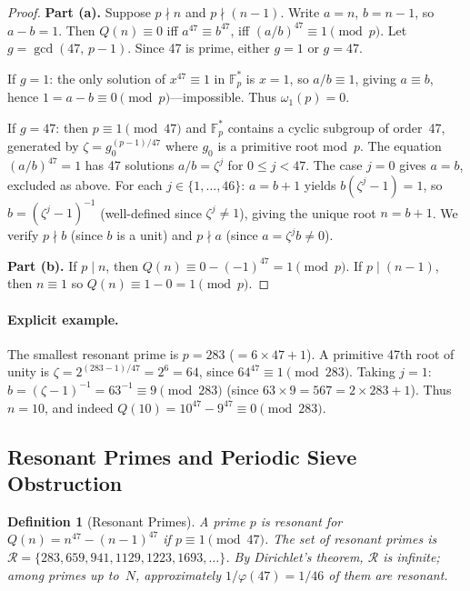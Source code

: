 \documentclass[11pt,a4paper]{article}
\newtheorem{definition}[theorem]{Definition}
\begin{document}
\begin{proof}
\textbf{Part (a).}  Suppose $p \nmid n$ and $p \nmid (n{-}1)$.  Write
$a = n$, $b = n{-}1$, so $a - b = 1$.  Then $Q(n) \equiv 0$
iff $a^{47} \equiv b^{47}$, iff $(a/b)^{47} \equiv 1 \pmod{p}$.
Let $g = \gcd(47,\, p{-}1)$.  Since 47 is prime, either $g = 1$
or $g = 47$.

If $g = 1$: the only solution of $x^{47} \equiv 1$ in
$\mathbb{F}_p^*$ is $x = 1$, so $a/b \equiv 1$, giving
$a \equiv b$, hence $1 = a - b \equiv 0 \pmod{p}$---impossible.
Thus $\omega_1(p) = 0$.

If $g = 47$: then $p \equiv 1 \pmod{47}$ and $\mathbb{F}_p^*$
contains a cyclic subgroup of order~47, generated by
$\zeta = g_0^{(p-1)/47}$ where $g_0$ is a primitive root mod~$p$.
The equation $(a/b)^{47} = 1$ has 47 solutions $a/b = \zeta^j$
for $0 \leq j < 47$.  The case $j = 0$ gives $a = b$, excluded as
above.  For each $j \in \{1, \ldots, 46\}$:
$a = b + 1$ yields $b(\zeta^j - 1) = 1$, so
$b = (\zeta^j - 1)^{-1}$ (well-defined since $\zeta^j \neq 1$),
giving the unique root $n = b + 1$.
We verify $p \nmid b$ (since $b$ is a unit) and $p \nmid a$
(since $a = \zeta^j b \neq 0$).

\textbf{Part (b).}  If $p \mid n$, then
$Q(n) \equiv 0 - (-1)^{47} = 1 \pmod{p}$.
If $p \mid (n{-}1)$, then $n \equiv 1$ so
$Q(n) \equiv 1 - 0 = 1 \pmod{p}$.
\end{proof}

\paragraph{Explicit example.}
The smallest resonant prime is $p = 283$ ($= 6 \times 47 + 1$).
A primitive 47th root of unity is $\zeta = 2^{(283-1)/47}
= 2^6 = 64$, since $64^{47} \equiv 1 \pmod{283}$.
Taking $j = 1$: $b = (\zeta - 1)^{-1} = 63^{-1} \equiv 9
\pmod{283}$ (since $63 \times 9 = 567 = 2 \times 283 + 1$).
Thus $n = 10$, and indeed
$Q(10) = 10^{47} - 9^{47} \equiv 0 \pmod{283}$.

\subsection{Resonant Primes and Periodic Sieve Obstruction}

\begin{definition}[Resonant Primes]
A prime $p$ is \emph{resonant} for $Q(n) = n^{47} - (n{-}1)^{47}$
if $p \equiv 1 \pmod{47}$.  The set of resonant primes is
$\mathcal{R} = \{283, 659, 941, 1129, 1223, 1693, \ldots\}$.
By Dirichlet's theorem, $\mathcal{R}$ is infinite; among primes
up to~$N$, approximately $1/\varphi(47) = 1/46$ of them are
resonant.
\end{definition}
\end{document}
